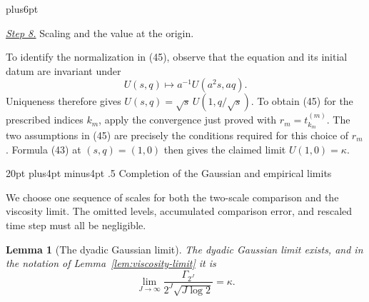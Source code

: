 \documentclass[11pt,reqno]{amsart}
\makeatletter
\def\section{\@startsection{section}{1}{0pt}%
  {20pt plus4pt minus4pt}
  {.5\linespacing}
  {\normalfont\bfseries}}
\theoremstyle{plain}
\newtheorem{lemma}[theorem]{Lemma}
\theoremstyle{definition}
\theoremstyle{remark}
\renewenvironment{proof}[1][\proofname]{%
  \par
  \pushQED{\qed}%
  \normalfont
  \topsep6pt plus6pt\relax
  \trivlist
  \item[\hskip\labelsep\slshape #1\@addpunct{.}]%
  \ignorespaces
}{%
  \popQED
  \endtrivlist
  \@endpefalse
}
\DeclareRobustCommand{\qed}{%
  \leavevmode\unskip\penalty9999\hbox{}\nobreak
  \ifmmode
    \makebox[0pt][l]{\qquad\hbox{\qedsymbol}}%
  \else
    \qquad\hbox{\qedsymbol}%
  \fi
}
\renewcommand{\qedsymbol}{\rule[.47pt]{4pt}{6pt}}
\numberwithin{equation}{section}
\newcommand{\1}{\mathbf 1}
\makeatother
\begin{document}
\begin{proof}
\smallskip\noindent
\underline{\textit{Step 8.}} Scaling and the value at the origin.

To identify the normalization in (45), observe that the equation and
its initial datum are invariant under
\begin{equation*}
U(s,q)\mapsto a^{-1}U(a^2s,aq).
\end{equation*}
Uniqueness therefore gives
$U(s,q)=\sqrt s\,U(1,q/\sqrt s)$.  To obtain (45) for the prescribed
indices $k_m$, apply the convergence just proved with
$r_m=t_{k_m}^{(m)}$.  The two assumptions in (45) are precisely the
conditions required for this choice of $r_m$.  Formula (43) at
$(s,q)=(1,0)$ then gives the claimed limit $U(1,0)=\kappa$.

\end{proof}

\section{Completion of the Gaussian and empirical limits}\label{sec:conclusion}

We choose one sequence of scales for both the two-scale comparison and
the viscosity limit.  The omitted levels, accumulated comparison error,
and rescaled time step must all be negligible.

\begin{lemma}[The dyadic Gaussian limit]\label{lem:dyadic-gaussian-limit}
The dyadic Gaussian limit exists, and in the notation of Lemma~\ref{lem:viscosity-limit} it is
\begin{equation}
\lim_ {J\to\infty}
\frac{\Gamma_ {2^J}}{2^J\sqrt{J\log2}}=\kappa.
\tag{49}
\end{equation}

\end{lemma}
\end{document}
